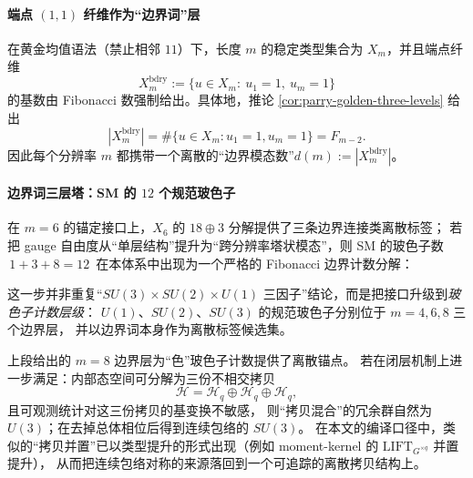 \label{subsec:bdry-tower-zeck-gut-part1}
\paragraph{端点 \texorpdfstring{$(1,1)$}{(1,1)} 纤维作为“边界词”层}
在黄金均值语法（禁止相邻 \(11\)）下，长度 \(m\) 的稳定类型集合为 \(X_m\)，并且端点纤维
\[
X_m^{\mathrm{bdry}}
:=\{u\in X_m:\ u_1=1,\ u_m=1\}
\]
的基数由 Fibonacci 数强制给出。具体地，推论 \ref{cor:parry-golden-three-levels} 给出
\[
|X_m^{\mathrm{bdry}}|
=\#\{u\in X_m:u_1=1,u_m=1\}
=F_{m-2}.
\]
因此每个分辨率 \(m\) 都携带一个离散的“边界模态数”\(d(m):=|X_m^{\mathrm{bdry}}|\)。

\paragraph{边界词三层塔：SM 的 \(12\) 个规范玻色子}
在 \(m=6\) 的锚定接口上，\(X_6\) 的 \(18\oplus 3\) 分解提供了三条边界连接类离散标签；
若把 gauge 自由度从“单层结构”提升为“跨分辨率塔状模态”，则 SM 的玻色子数
\(\,1+3+8=12\,\)
在本体系中出现为一个严格的 Fibonacci 边界计数分解：

这一步并非重复“\(SU(3)\times SU(2)\times U(1)\) 三因子”结论，而是把接口升级到\emph{玻色子计数层级}：
\(U(1)\)、\(SU(2)\)、\(SU(3)\) 的规范玻色子分别位于 \(m=4,6,8\) 三个边界层，
并以边界词本身作为离散标签候选集。

\begin{remark}\label{rem:color-as-three-copy-envelope}
上段给出的 \(m=8\) 边界层为“色”玻色子计数提供了离散锚点。
若在闭层机制上进一步满足：内部态空间可分解为三份不相交拷贝
\[
\mathcal{H}=\mathcal{H}_q\oplus\mathcal{H}_q\oplus\mathcal{H}_q,
\]
且可观测统计对这三份拷贝的基变换不敏感，
则“拷贝混合”的冗余群自然为 \(U(3)\)；在去掉总体相位后得到连续包络的 \(SU(3)\)。
在本文的编译口径中，类似的“拷贝并置”已以类型提升的形式出现（例如 moment-kernel 的 \(\mathrm{LIFT}_{G^{\times q}}\) 并置提升），
从而把连续包络对称的来源落回到一个可追踪的离散拷贝结构上。
\end{remark}

